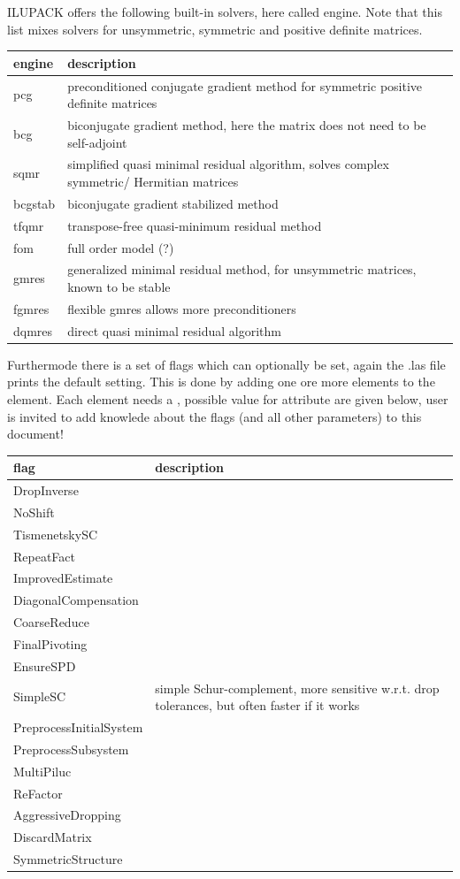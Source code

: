 ILUPACK offers the following built-in solvers, here called engine. Note that
this list mixes solvers for unsymmetric, symmetric and positive definite
matrices.
\begin{center}
\begin{tabular}{lp{}}
\toprule
engine & description \\
\midrule
pcg & preconditioned conjugate gradient method for symmetric positive definite
matrices\\
bcg & biconjugate gradient method, here the matrix does not need to be
self-adjoint\\ 
sqmr & simplified quasi minimal residual algorithm, solves complex symmetric/
Hermitian matrices\\
bcgstab & biconjugate gradient stabilized method\\
tfqmr & transpose-free quasi-minimum residual method\\
fom & full order model (?)\\
gmres & generalized minimal residual method, for unsymmetric matrices, known to
be stable\\
fgmres & flexible gmres allows more preconditioners\\
dqmres & direct quasi minimal residual algorithm\\
\bottomrule
\end{tabular}
\end{center}
Furthermode there is a set of flags which can optionally be set, again the .las
file prints the default setting. This is done by adding one ore more
 elements to the  element. Each element needs a
, possible value for attribute  are given below,
user is invited to add knowlede about the flags (and all other parameters) to
this document!
\begin{center}
\begin{tabular}{lp{}}
\toprule
flag & description \\
\midrule
DropInverse & \\
NoShift & \\
TismenetskySC & \\
RepeatFact & \\
ImprovedEstimate & \\
DiagonalCompensation & \\
CoarseReduce & \\
FinalPivoting & \\
EnsureSPD & \\
SimpleSC & simple Schur-complement, more sensitive w.r.t. drop tolerances, but
often faster if it works\\
PreprocessInitialSystem & \\
PreprocessSubsystem & \\
MultiPiluc & \\
ReFactor & \\
AggressiveDropping & \\
DiscardMatrix & \\
SymmetricStructure & \\
\bottomrule
\end{tabular}
\end{center}

